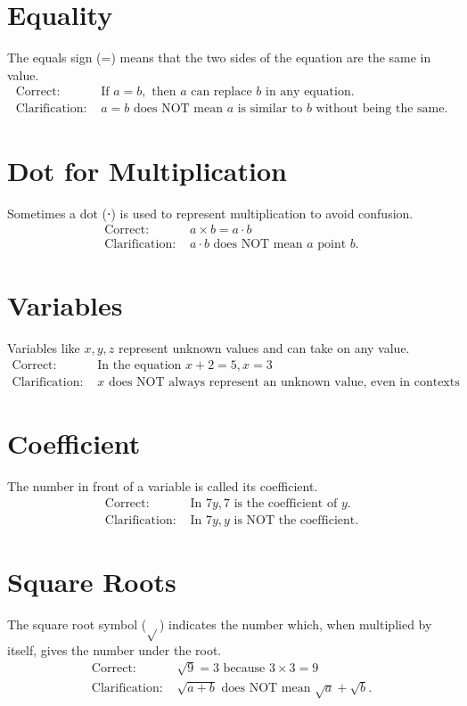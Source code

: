 \documentclass[12pt]{article}
\begin{document}
\section*{Equality}
The equals sign (=) means that the two sides of the equation are the same in value.
\begin{align*}
    \text{Correct: } & \text{If } a = b, \text{ then } a \text{ can replace } b \text{ in any equation.} \\
    \text{Clarification: } & a = b \text{ does NOT mean } a \text{ is similar to } b \text{ without being the same.}
\end{align*}

\section*{Dot for Multiplication}
Sometimes a dot (⋅) is used to represent multiplication to avoid confusion.
\begin{align*}
    \text{Correct: } & a \times b = a \cdot b \\
    \text{Clarification: } & a \cdot b \text{ does NOT mean } a \text{ point } b.
\end{align*}

\section*{Variables}
Variables like \(x, y, z\) represent unknown values and can take on any value.
\begin{align*}
    \text{Correct: } & \text{In the equation } x + 2 = 5, x = 3 \\
    \text{Clarification: } & x \text{ does NOT always represent an unknown value, even in contexts where its value has been defined.}
\end{align*}

\section*{Coefficient}
The number in front of a variable is called its coefficient.
\begin{align*}
    \text{Correct: } & \text{In } 7y, 7 \text{ is the coefficient of } y. \\
    \text{Clarification: } & \text{In } 7y, y \text{ is NOT the coefficient.}
\end{align*}

\section*{Square Roots}
The square root symbol (\(\sqrt{} \)) indicates the number which, when multiplied by itself, gives the number under the root.
\begin{align*}
    \text{Correct: } & \sqrt{9} = 3 \text{ because } 3 \times 3 = 9 \\
    \text{Clarification: } & \sqrt{a + b} \text{ does NOT mean } \sqrt{a} + \sqrt{b}.
\end{align*}
\end{document}
